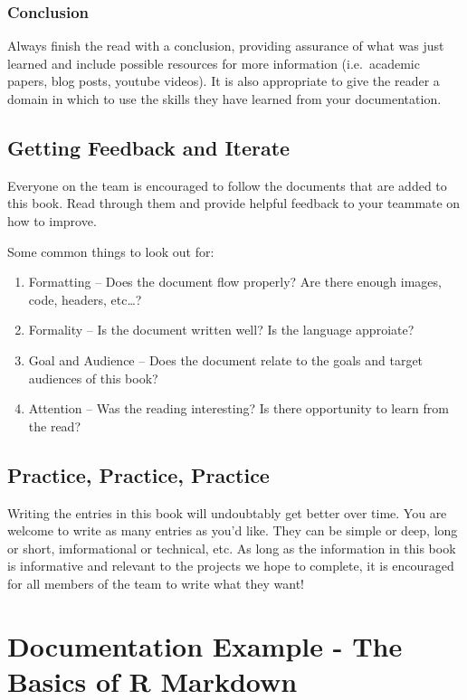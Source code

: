 \documentclass[]{book}
\begin{document}
\subsection{Conclusion}\label{conclusion}

Always finish the read with a conclusion, providing assurance of what
was just learned and include possible resources for more information
(i.e.~academic papers, blog posts, youtube videos). It is also
appropriate to give the reader a domain in which to use the skills they
have learned from your documentation.

\section{Getting Feedback and
Iterate}\label{getting-feedback-and-iterate}

Everyone on the team is encouraged to follow the documents that are
added to this book. Read through them and provide helpful feedback to
your teammate on how to improve.

Some common things to look out for:

\begin{enumerate}
\def\labelenumi{\arabic{enumi}.}
\item
  Formatting -- Does the document flow properly? Are there enough
  images, code, headers, etc\ldots{}?
\item
  Formality -- Is the document written well? Is the language approiate?
\item
  Goal and Audience -- Does the document relate to the goals and target
  audiences of this book?
\item
  Attention -- Was the reading interesting? Is there opportunity to
  learn from the read?
\end{enumerate}

\section{Practice, Practice, Practice}\label{practice-practice-practice}

Writing the entries in this book will undoubtably get better over time.
You are welcome to write as many entries as you'd like. They can be
simple or deep, long or short, imformational or technical, etc. As long
as the information in this book is informative and relevant to the
projects we hope to complete, it is encouraged for all members of the
team to write what they want!

\chapter{Documentation Example - The Basics of R
Markdown}\label{documentation-example---the-basics-of-r-markdown}
\end{document}
